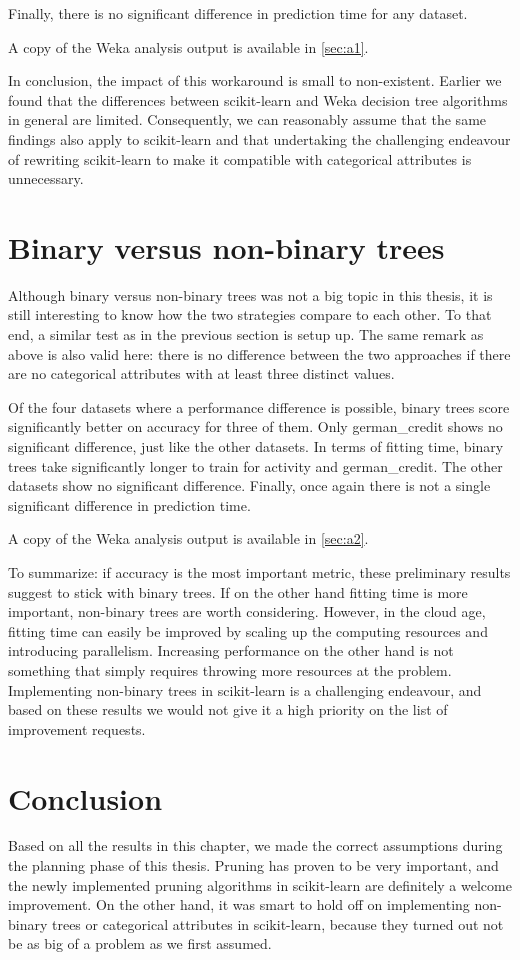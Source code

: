 Finally, there is no significant difference in prediction time for any dataset.

A copy of the Weka analysis output is available in \autoref{sec:a1}.

In conclusion, the impact of this workaround is small to non-existent. Earlier we found that the differences between scikit-learn and Weka decision tree algorithms in general are limited. Consequently, we can reasonably assume that the same findings also apply to scikit-learn and that undertaking the challenging endeavour of rewriting scikit-learn to make it compatible with categorical attributes is unnecessary.

\section{Binary versus non-binary trees}
Although binary versus non-binary trees was not a big topic in this thesis, it is still interesting to know how the two strategies compare to each other. To that end, a similar test as in the previous section is setup up. The same remark as above is also valid here: there is no difference between the two approaches if there are no categorical attributes with at least three distinct values.

Of the four datasets where a performance difference is possible, binary trees score significantly better on accuracy for three of them. Only german\_credit shows no significant difference, just like the other datasets. In terms of fitting time, binary trees take significantly longer to train for activity and german\_credit. The other datasets show no significant difference. Finally, once again there is not a single significant difference in prediction time.

A copy of the Weka analysis output is available in \autoref{sec:a2}.

To summarize: if accuracy is the most important metric, these preliminary results suggest to stick with binary trees. If on the other hand fitting time is more important, non-binary trees are worth considering. However, in the cloud age, fitting time can easily be improved by scaling up the computing resources and introducing parallelism. Increasing performance on the other hand is not something that simply requires throwing more resources at the problem. Implementing non-binary trees in scikit-learn is a challenging endeavour, and based on these results we would not give it a high priority on the list of improvement requests.

\section{Conclusion}
Based on all the results in this chapter, we made the correct assumptions during the planning phase of this thesis. Pruning has proven to be very important, and the newly implemented pruning algorithms in scikit-learn are definitely a welcome improvement. On the other hand, it was smart to hold off on implementing non-binary trees or categorical attributes in scikit-learn, because they turned out not be as big of a problem as we first assumed.